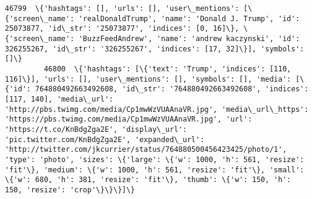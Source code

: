 \documentclass[11pt]{article}
\begin{document}
\begin{Verbatim}[commandchars=\\\{\}]
         46799  \{'hashtags': [], 'urls': [], 'user\_mentions': [\{'screen\_name': 'realDonaldTrump', 'name': 'Donald J. Trump', 'id': 25073877, 'id\_str': '25073877', 'indices': [0, 16]\}, \{'screen\_name': 'BuzzFeedAndrew', 'name': 'andrew kaczynski', 'id': 326255267, 'id\_str': '326255267', 'indices': [17, 32]\}], 'symbols': []\}                                                                                                                                                                                                                                                                                                                                                                                                                                                                                                                                                                                                                                                                                                                                                                                                                                                                                            
         46800  \{'hashtags': [\{'text': 'Trump', 'indices': [110, 116]\}], 'urls': [], 'user\_mentions': [], 'symbols': [], 'media': [\{'id': 764880492663492608, 'id\_str': '764880492663492608', 'indices': [117, 140], 'media\_url': 'http://pbs.twimg.com/media/Cp1mwWzVUAAnaVR.jpg', 'media\_url\_https': 'https://pbs.twimg.com/media/Cp1mwWzVUAAnaVR.jpg', 'url': 'https://t.co/KnBdgZga2E', 'display\_url': 'pic.twitter.com/KnBdgZga2E', 'expanded\_url': 'http://twitter.com/jkcurrier/status/764880500456423425/photo/1', 'type': 'photo', 'sizes': \{'large': \{'w': 1000, 'h': 561, 'resize': 'fit'\}, 'medium': \{'w': 1000, 'h': 561, 'resize': 'fit'\}, 'small': \{'w': 680, 'h': 381, 'resize': 'fit'\}, 'thumb': \{'w': 150, 'h': 150, 'resize': 'crop'\}\}\}]\}                                                                                                                                                                                                                                                                                                                                                                                                                                                                   

\end{Verbatim}
\end{document}
